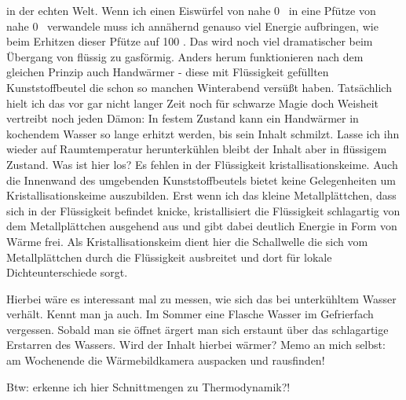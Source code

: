 in der echten Welt. Wenn ich einen Eiswürfel von nahe 0 \celsius\ in eine Pfütze von nahe 0 \celsius\ verwandele muss ich annähernd genauso viel Energie aufbringen, wie beim Erhitzen
dieser Pfütze auf 100 \celsius. Das wird noch viel dramatischer beim Übergang von flüssig zu gasförmig. Anders herum funktionieren nach dem gleichen Prinzip auch Handwärmer - diese
mit Flüssigkeit gefüllten Kunststoffbeutel die schon so manchen Winterabend versüßt haben. Tatsächlich hielt ich das vor gar nicht langer Zeit noch für schwarze Magie doch Weisheit
vertreibt noch jeden Dämon: In festem Zustand kann ein Handwärmer in kochendem Wasser so lange erhitzt werden, bis sein Inhalt schmilzt. Lasse ich ihn wieder auf Raumtemperatur
herunterkühlen bleibt der Inhalt aber in flüssigem Zustand. Was ist hier los? Es fehlen in der Flüssigkeit kristallisationskeime. Auch die Innenwand des umgebenden Kunststoffbeutels
bietet keine Gelegenheiten um Kristallisationskeime auszubilden. Erst wenn ich das kleine Metallplättchen, dass sich in der Flüssigkeit befindet knicke, kristallisiert die Flüssigkeit
schlagartig von dem Metallplättchen ausgehend aus und gibt dabei deutlich Energie in Form von Wärme frei. Als Kristallisationskeim dient hier die Schallwelle die sich vom Metallplättchen
durch die Flüssigkeit ausbreitet und dort für lokale Dichteunterschiede sorgt.\par
Hierbei wäre es interessant mal zu messen, wie sich das bei unterkühltem Wasser verhält. Kennt man ja auch. Im Sommer eine Flasche Wasser im Gefrierfach vergessen. Sobald man sie öffnet ärgert
man sich erstaunt über das schlagartige Erstarren des Wassers. Wird der Inhalt hierbei wärmer? Memo an mich selbst: am Wochenende die Wärmebildkamera auspacken und rausfinden!

Btw: erkenne ich hier Schnittmengen zu Thermodynamik?!